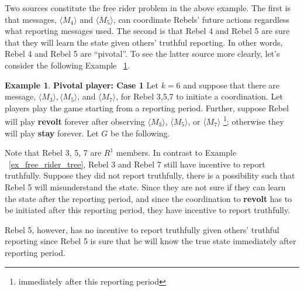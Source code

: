 \documentclass[12pt,letterpaper]{article}
\newtheorem*{main result}{Main Result}
\theoremstyle{definition}
\newtheorem{example}{Example}[section]
\theoremstyle{remark}
\theoremstyle{claim}
\begin{document}
Two sources constitute the free rider problem in the above example. The first is that messages, $\langle M_4 \rangle$ and $\langle M_5 \rangle$, can coordinate Rebels' future actions regardless what reporting messages used. The second is that Rebel 4 and Rebel 5 are sure that they will learn the state given others' truthful reporting. In other words, Rebel 4 and Rebel 5 are ``pivotal''. To see the latter source more clearly, let's consider the following Example ~\ref{ex_pivotal_1}.



\begin{example} \label{ex_pivotal_1}\textbf{Pivotal player: Case 1}
Let $k=6$ and suppose that there are message, $\langle M_3 \rangle,\langle M_5 \rangle$, and $ \langle M_7 \rangle$, for Rebel 3,5,7 to initiate a coordination. Let players play the game starting from a reporting period. Further, suppose Rebel will play \textbf{revolt} forever after observing $\langle M_3 \rangle$, $\langle M_5 \rangle$, or $\langle M_7 \rangle$ \footnote{immediately after this reporting period}; otherwise they will play \textbf{stay} forever. Let $G$ be the following.
\begin{center}
\end{center}

Note that Rebel 3, 5, 7 are $R^1$ members. In contrast to Example ~\ref{ex_free_rider_tree}, Rebel 3 and Rebel 7 still have incentive to report truthfully. Suppose they did not report truthfully, there is a possibility such that Rebel 5 will misunderstand the state. Since they are not sure if they can learn the state after the reporting period, and since the coordination to \textbf{revolt} has to be initiated after this reporting period, they have incentive to report truthfully.

Rebel 5, however, has no incentive to report truthfully given others' truthful reporting since Rebel 5 is sure that he will know the true state immediately after reporting period.
\end{example}
   
\end{document}
